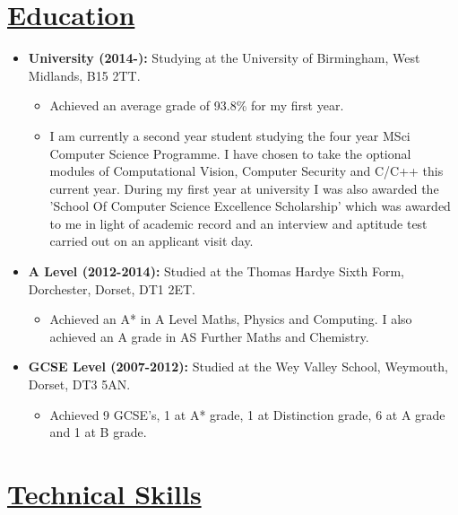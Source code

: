 \documentclass[11pt]{article}
\begin{document}
	
	\hspace{-100pt}\section*{\underline{Education}}
		\begin {itemize}
			\item \textbf{University (2014-):} Studying at the University of Birmingham, West Midlands, B15 2TT.
				\begin{itemize}
					\item Achieved an average grade of 93.8\% for my first year.
					\item I am currently a second year student studying the four year MSci Computer Science Programme. I have chosen to take the optional modules of Computational Vision, Computer Security and C/C++ this current year. During my first year at 							university I was also awarded the 'School Of Computer Science Excellence Scholarship' which was awarded to me in light of academic record and an interview and aptitude test carried out on an applicant visit day.
				\end{itemize}
			\item \textbf{A Level (2012-2014):} Studied at the Thomas Hardye Sixth Form, Dorchester, Dorset, DT1 2ET.
				\begin{itemize}
					\item Achieved an A* in A Level Maths, Physics and Computing. I also achieved an A grade in AS Further Maths and Chemistry.
				\end{itemize}
			
			\item \textbf{GCSE Level (2007-2012):}  Studied at the Wey Valley School, Weymouth, Dorset, DT3 5AN. 
				\begin{itemize}
					\item Achieved 9 GCSE's, 1 at A* grade, 1 at Distinction grade, 6 at A grade and 1 at B grade.
				\end{itemize} 
		\end{itemize}
	\vspace{-20pt}
	\hspace{-100pt}\section*{\underline{Technical Skills}}
\end{document}
